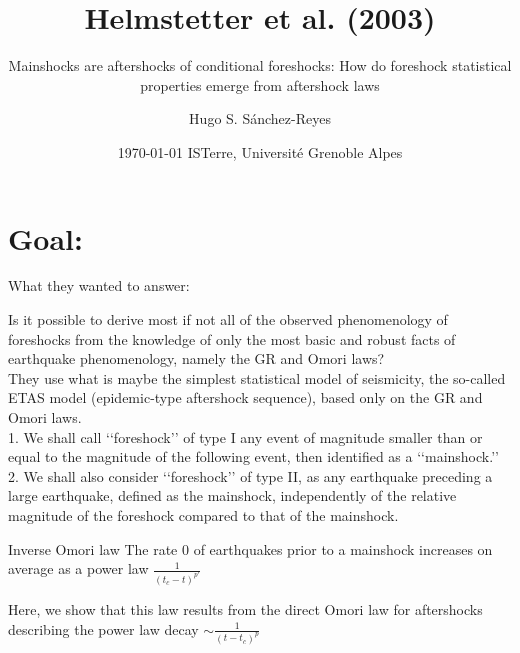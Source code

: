 \documentclass[aspectratio=43,9pt]{beamer}
\title{Helmstetter et al. (2003)}								%
\subtitle{Mainshocks are aftershocks of conditional foreshocks:
How do foreshock statistical properties emerge from
aftershock laws}					%
\date{\today}
\author{Hugo S. S\'anchez-Reyes}								%
\institute{ \begin{center}  \end{center} }							%
\date{ ISTerre, Universit\'e Grenoble Alpes}
\begin{document}
\maketitle


\section{Goal: }

\begin{frame}{What they wanted to answer:}

Is it possible to derive most if not all of the observed
phenomenology of foreshocks from the knowledge of only
the most basic and robust facts of earthquake phenomenology, 
namely the GR and Omori laws? \\
\vskip 0.2cm
They use what is maybe the simplest statistical model
of seismicity, the so-called ETAS model (epidemic-type aftershock sequence),
based only on the GR and Omori laws.\\
\vskip 0.2cm
1. We shall call ‘‘foreshock’’ of type I any event of
magnitude smaller than or equal to the magnitude of the
following event, then identified as a ‘‘mainshock.’’\\
\vskip 0.2cm
2. We shall also consider ‘‘foreshock’’ of type II, as any
earthquake preceding a large earthquake, defined as the
mainshock, independently of the relative magnitude of the
foreshock compared to that of the mainshock.\\
\vskip 0.2cm 
\begin{minipage}{0.45\linewidth}
 Inverse Omori law
 The rate 0 of earthquakes prior to a mainshock increases on average as a power law 
  $ \frac{1}{(t_c-t)^{p'}}$
\end{minipage} \quad
\begin{minipage}{0.45\linewidth}
 Here, we show that this law results from the
 direct Omori law for aftershocks describing the power law decay $\sim \frac{1}{(t-t_c)^p}$
\end{minipage}


\end{frame}
\end{document}
